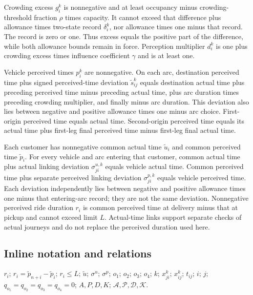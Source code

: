 \documentclass[10pt]{article}
\begin{document}
Crowding excess $g_i^k$ is nonnegative and at least occupancy minus crowding-threshold fraction $\rho$ times capacity. It cannot exceed that difference plus allowance times two-state record $\delta_i^k$, nor allowance times one minus that record. The record is zero or one. Thus excess equals the positive part of the difference, while both allowance bounds remain in force. Perception multiplier $d_i^k$ is one plus crowding excess times influence coefficient $\gamma$ and is at least one.

Vehicle perceived times $p_i^k$ are nonnegative. On each arc, destination perceived time plus signed perceived-time deviation $\tilde s_{ij}^k$ equals destination actual time plus preceding perceived time minus preceding actual time, plus arc duration times preceding crowding multiplier, and finally minus arc duration. This deviation also lies between negative and positive allowance times one minus arc choice. First-origin perceived time equals actual time. Second-origin perceived time equals its actual time plus first-leg final perceived time minus first-leg final actual time.

Each customer has nonnegative common actual time $\tilde u_i$ and common perceived time $\tilde p_i$. For every vehicle and arc entering that customer, common actual time plus actual linking deviation $\sigma_{ji}^{u,k}$ equals vehicle actual time. Common perceived time plus separate perceived linking deviation $\sigma_{ji}^{p,k}$ equals vehicle perceived time. Each deviation independently lies between negative and positive allowance times one minus that entering-arc record; they are not the same deviation. Nonnegative perceived ride duration $r_i$ is common perceived time at delivery minus that at pickup and cannot exceed limit $L$. Actual-time links support separate checks of actual journeys and do not replace the perceived duration used here.

\subsection*{Inline notation and relations}
$r_i$; $r_i=\tilde p_{n+i}-\tilde p_i$; $r_i\le L$; $\tilde u$; $\sigma^u$; $\sigma^p$; $o_1$; $o_2$; $o_3$; $o_4$; $k$; $x_{ji}^k$; $x_{ij}^k$; $t_{ij}$; $i$; $j$; $q_{o_1}=q_{o_2}=q_{o_3}=q_{o_4}=0$; $A,P,D,K$; $\mathcal A,\mathcal P,\mathcal D,\mathcal K$.
\end{document}
